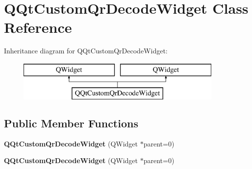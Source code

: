 \hypertarget{class_q_qt_custom_qr_decode_widget}{}\section{Q\+Qt\+Custom\+Qr\+Decode\+Widget Class Reference}
\label{class_q_qt_custom_qr_decode_widget}
Inheritance diagram for Q\+Qt\+Custom\+Qr\+Decode\+Widget\+:\begin{figure}[H]
\begin{center}
\leavevmode
\includegraphics[height=2.000000cm]{class_q_qt_custom_qr_decode_widget}
\end{center}
\end{figure}
\subsection*{Public Member Functions}
\begin{DoxyCompactItemize}
\item 
\mbox{\label{class_q_qt_custom_qr_decode_widget_a530adcc25d57c6c7da19d5e2b8280a39}} 
{\bfseries Q\+Qt\+Custom\+Qr\+Decode\+Widget} (Q\+Widget $\ast$parent=0)
\item 
\mbox{\label{class_q_qt_custom_qr_decode_widget_a530adcc25d57c6c7da19d5e2b8280a39}} 
{\bfseries Q\+Qt\+Custom\+Qr\+Decode\+Widget} (Q\+Widget $\ast$parent=0)
\end{DoxyCompactItemize}
